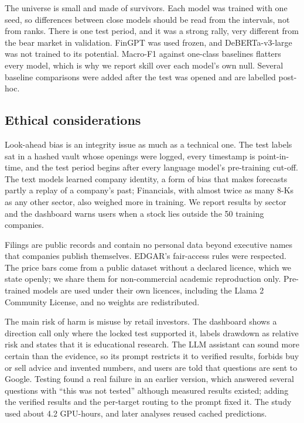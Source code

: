 \documentclass[conference]{IEEEtran}
\begin{document}
The universe is small and made of survivors. Each model was trained with one seed, so differences between close models should be read from the intervals, not from ranks. There is one test period, and it was a strong rally, very different from the bear market in validation. FinGPT was used frozen, and DeBERTa-v3-large was not trained to its potential. Macro-F1 against one-class baselines flatters every model, which is why we report skill over each model's own null. Several baseline comparisons were added after the test was opened and are labelled post-hoc.

\subsection{Ethical considerations}

Look-ahead bias is an integrity issue as much as a technical one. The test labels sat in a hashed vault whose openings were logged, every timestamp is point-in-time, and the test period begins after every language model's pre-training cut-off. The text models learned company identity, a form of bias that makes forecasts partly a replay of a company's past; Financials, with almost twice as many 8-Ks as any other sector, also weighed more in training. We report results by sector and the dashboard warns users when a stock lies outside the 50 training companies.

Filings are public records and contain no personal data beyond executive names that companies publish themselves. EDGAR's fair-access rules were respected. The price bars come from a public dataset without a declared licence, which we state openly; we share them for non-commercial academic reproduction only. Pre-trained models are used under their own licences, including the Llama 2 Community License, and no weights are redistributed.

The main risk of harm is misuse by retail investors. The dashboard shows a direction call only where the locked test supported it, labels drawdown as relative risk and states that it is educational research. The LLM assistant can sound more certain than the evidence, so its prompt restricts it to verified results, forbids buy or sell advice and invented numbers, and users are told that questions are sent to Google. Testing found a real failure in an earlier version, which answered several questions with ``this was not tested'' although measured results existed; adding the verified results and the per-target routing to the prompt fixed it. The study used about 4.2 GPU-hours, and later analyses reused cached predictions.
\end{document}
